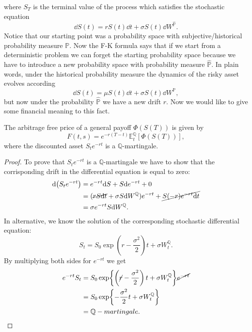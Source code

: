where $S_T$ is the terminal value of the process which satisfies the stochastic equation
\begin{equation}
    \dd S(t) = rS(t)\dd t + \sigma S(t)\dd W^{\hat{\mathbb{P}}}.
\end{equation}
Notice that our starting point was a probability space with subjective/historical probability measure $\mathbb{P}$. Now the F-K formula says that if we start from a deterministic problem we can forget the starting probability space because we have to introduce a new probability space with probability measure $\hat{\mathbb{P}}$. In plain words, under the historical probability measure the dynamics of the risky asset evolves according
\begin{equation}
    \dd S(t) =  \mu S(t)\dd t + \sigma S(t)\dd W^{\mathbb{P}},
\end{equation}
but now under the probability $\hat{\mathbb{P}}$ we have a new drift $r$. Now we would like to give some financial meaning to this fact.
\begin{proposition}
    The arbitrage free price of a general payoff $\Phi(S(T))$ is given by
    \begin{equation}\label{rnv}
        F(t,s) = e^{-r(T-t)}\mathbb{E}^{\mathbb{Q}}_t [\Phi(S(T))],
    \end{equation}
    where the discounted asset $S_te^{-rt}$ is a $\mathbb{Q}$-martingale.
\end{proposition}
\begin{proof}
    To prove that $S_te^{-rt}$ is a $\mathbb{Q}$-martingale we have to show that the corrisponding drift in the differential equation is equal to zero:
    \begin{align*}
        \dd(S_te^{-rt}) &= e^{-rt}\dd S + S\dd e^{-rt} + 0 \\
        &=
        (\cancel{rS\dd t} + \sigma S\dd W^{\mathbb{Q}})e^{-rt} + \cancel{S(-r)e^{-rt}\dd t} \\
        &=
        \sigma e^{-rt} S\dd W^{\mathbb{Q}}.
    \end{align*}
    In alternative, we know the solution of the corresponding stochastic differential equation:
    \begin{equation*}
        S_t = S_0\exp{\left(r-\frac{\sigma^2}{2}\right)t + \sigma W_t^\mathbb{Q}}.
    \end{equation*}
    By multiplying both sides for $e^{-rt}$ we get
    \begin{align*}
        e^{-rt}S_t &= S_0\exp{\left(\cancel{r}-\frac{\sigma^2}{2}\right)t + \sigma W_t^\mathbb{Q}}\cancel{e^{-rt}} \\
        &=
        S_0\exp{-\frac{\sigma^2}{2}t + \sigma W_t^\mathbb{Q}} \\
        &=
        \mathbb{Q}-martingale.
    \end{align*}
\end{proof}
